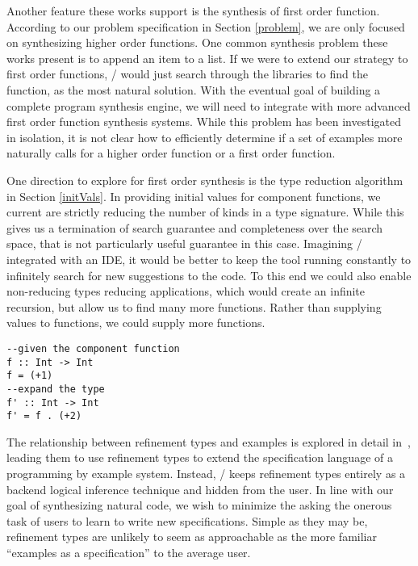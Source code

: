 Another feature these works support is the synthesis of first order function.
According to our problem specification in Section \ref{problem}, we are only focused on synthesizing higher order functions. 
One common synthesis problem these works present is to append an item to a list.
If we were to extend our strategy to first order functions, \ourTool/ would just search through the libraries to find the  function, as the most natural solution. 
With the eventual goal of building a complete program synthesis engine, we will need to integrate with more advanced first order function synthesis systems.
While this problem has been investigated in isolation, it is not clear how to efficiently determine if a set of examples more naturally calls for a higher order function or a first order function.

One direction to explore for first order synthesis is the type reduction algorithm in Section \ref{initVals}.
In providing initial values for component functions, we current are strictly reducing the number of kinds in a type signature.
While this gives us a termination of search guarantee and completeness over the search space, that is not particularly useful guarantee in this case.
Imagining \ourTool/ integrated with an IDE, it would be better to keep the tool running constantly to infinitely search for new suggestions to the code.
To this end we could also enable non-reducing types reducing applications, which would create an infinite recursion, but allow us to find many more functions.
Rather than supplying values to functions, we could supply more functions.

\begin{lstlisting}
--given the component function
f :: Int -> Int
f = (+1)
--expand the type
f' :: Int -> Int
f' = f . (+2)

\end{lstlisting} 

The relationship between refinement types and examples is explored in detail in~\cite{Osera:2016}, leading them to use refinement types to extend the specification language of a programming by example system. Instead, \ourTool/ keeps refinement types entirely as a backend logical inference technique and hidden from the user. In line with our goal of synthesizing natural code, we wish to minimize the asking the onerous task of users to learn to write new specifications. Simple as they may be, refinement types are unlikely to seem as approachable as the more familiar ``examples as a specification'' to the average user. 

